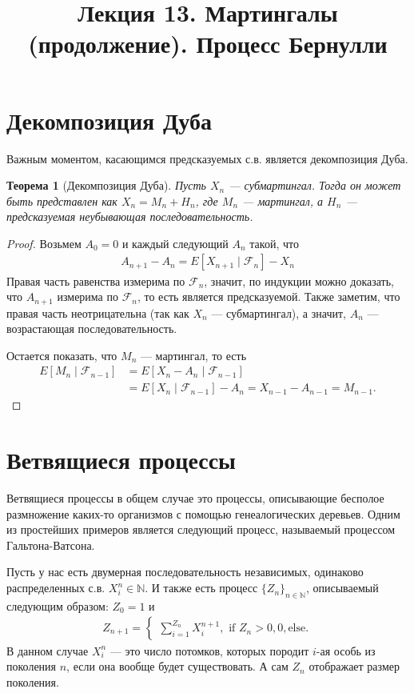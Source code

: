 \documentclass[12pt]{article}
\title{Лекция 13. Мартингалы (продолжение). Процесс Бернулли}
\newcommand\N{\mathbb{N}}
\newcommand\F{\mathcal{F}}
\newtheorem{theorem}{Теорема}
\begin{document}
\maketitle

\section{Декомпозиция Дуба}

Важным моментом, касающимся предсказуемых с.в. является декомпозиция Дуба.
\begin{theorem}[Декомпозиция Дуба]
  Пусть $X_n$ --- субмартингал. Тогда он может быть представлен как $X_n = M_n + H_n$, где $M_n$ --- мартингал, а $H_n$ --- предсказуемая неубывающая последовательность.
\end{theorem} 
\begin{proof}
  Возьмем $A_0 = 0$ и каждый следующий $A_n$ такой, что
  \begin{align*}
    A_{n + 1} - A_n = E[X_{n + 1} \mid \F_n] - X_n
  \end{align*}
  Правая часть равенства измерима по $\F_n$, значит, по индукции можно доказать, что $A_{n + 1}$ измерима по $\F_n$, то есть является предсказуемой. Также заметим, что правая часть неотрицательна (так как $X_n$ --- субмартингал), а значит, $A_n$ --- возрастающая последовательность.

  Остается показать, что $M_n$ --- мартингал, то есть
  \begin{align*}
    E[M_n \mid \F_{n - 1}] &= E[X_n - A_n \mid \F_{n - 1}] \\
    &= E[X_n \mid \F_{n -1}] - A_n = X_{n - 1} - A_{n - 1} = M_{n - 1}.
  \end{align*}
\end{proof}

\section{Ветвящиеся процессы}

Ветвящиеся процессы в общем случае это процессы, описывающие бесполое размножение каких-то организмов с помощью генеалогических деревьев. Одним из простейших примеров является следующий процесс, называемый процессом Гальтона-Ватсона.

Пусть у нас есть двумерная последовательность независимых, одинаково распределенных с.в. $X_i^n \in \N$. И также есть процесс $\{Z_n\}_{n \in \N}$, описываемый следующим образом: $Z_0 = 1$ и
\begin{align*}
  Z_{n + 1} = \begin{cases}
    \sum_{i = 1}^{Z_n} X_i^{n + 1}, \text{ if } Z_n > 0,
    0, \text{else}. 
  \end{cases}
\end{align*}
В данном случае $X_i^n$ --- это число потомков, которых породит $i$-ая особь из поколения $n$, если она вообще будет существовать. А сам $Z_n$ отображает размер поколения.
\end{document}
